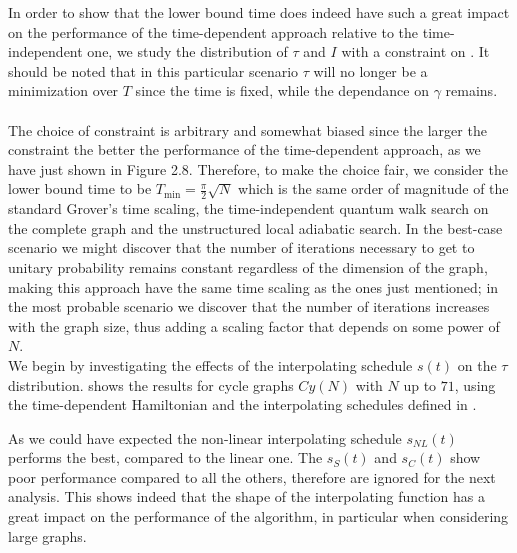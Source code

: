         \vspace{0.5cm}
        In order to show that the lower bound time does indeed have such a great impact on the performance of the time-dependent approach relative to the time-independent one, we study the distribution of $\tau$ and $I$ with a constraint on \tmin. It should be noted that in this particular scenario $\tau$ will no longer be a minimization over $T$ since the time is fixed, while the dependance on $\gamma$ remains. \\ \\ The choice of constraint is arbitrary and somewhat biased since the larger the constraint the better the performance of the time-dependent approach, as we have just shown in Figure 2.8. Therefore, to make the choice fair, we consider the lower bound time to be $T_{\min} = \frac{\pi}{2}\sqrt{N}$ which is the same order of magnitude of the standard Grover's time scaling, the time-independent quantum walk search on the complete graph and the unstructured local adiabatic search. In the best-case scenario we might discover that the number of iterations necessary to get to unitary probability remains constant regardless of the dimension of the graph, making this approach have the same time scaling as the ones just mentioned; in the most probable scenario we discover that the number of iterations increases with the graph size, thus adding a scaling factor that depends on some power of $N$. \\

        \noindent
        We begin by investigating the effects of the interpolating schedule $s(t)$ on the $\tau$ distribution.  shows the results for cycle graphs $Cy(N)$ with $N$ up to $71$, using the time-dependent Hamiltonian and the interpolating schedules defined in .
        \clearpage
        

        As we could have expected the non-linear interpolating schedule $s_{NL}(t)$ performs the best, compared to the linear one. The $s_S(t)$ and $s_C(t)$ show poor performance compared to all the others, therefore are ignored for the next analysis.  This shows indeed that the shape of the interpolating function has a great impact on the performance of the algorithm, in particular when considering large graphs. \\

